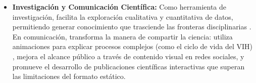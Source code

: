 \documentclass[12pt,a4paper]{article}
\begin{document}
\begin{itemize}
    \item \textbf{Investigación y Comunicación Científica:} Como herramienta de investigación, facilita la exploración cualitativa y cuantitativa de datos, permitiendo generar conocimiento que trasciende las fronteras disciplinarias \cite{Moorhead2006}. En comunicación, transforma la manera de compartir la ciencia: utiliza animaciones para explicar procesos complejos (como el ciclo de vida del VIH) \cite{nayak2019}, mejora el alcance público a través de contenido visual en redes sociales, y promueve el desarrollo de publicaciones científicas interactivas que superan las limitaciones del formato estático.

\end{itemize}





\end{document}
